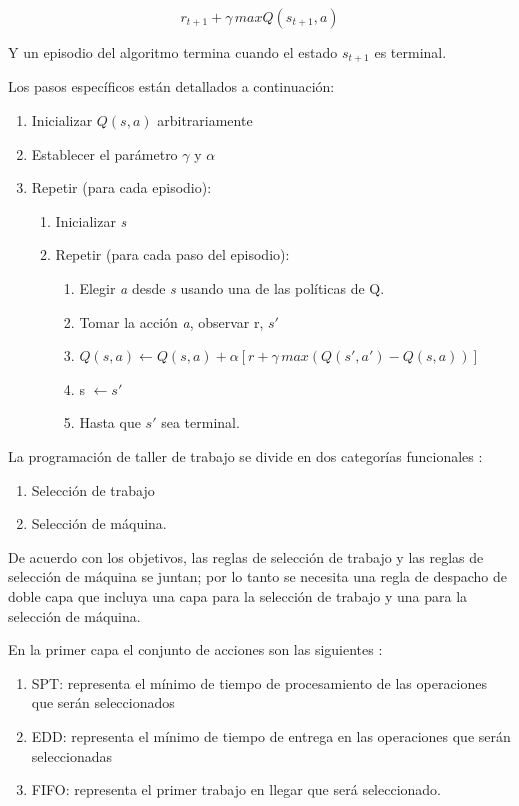 \documentclass[letterpaper, 10 pt]{article}
\begin{document}
\begin{equation}
	r_{t+1} + \gamma \, max Q(s_{t+1},a)
\end{equation} 

Y un episodio del algoritmo termina cuando el estado $s_{t+1}$ es terminal.

Los pasos específicos están detallados a continuación:

\begin{enumerate}
	\item Inicializar $Q(s,a)$ arbitrariamente
	\item Establecer el parámetro $\gamma$ y $\alpha$
	\item Repetir (para cada episodio):
	\begin{enumerate}[1]
		\item Inicializar \textit{s}
		\item Repetir (para cada paso del episodio):
		\begin{enumerate}[2.1]
			\item Elegir \textit{a} desde \textit{s} usando una de las políticas de Q.
			\item Tomar la acción \textit{a}, observar r, $s'$
			\item $	\displaystyle	Q(s,a) \leftarrow Q(s,a) + \alpha[r + \gamma \, max(Q(s',a') - Q(s,a) )] $
			\item s $\leftarrow s'$ 
			\item Hasta que $s'$ sea terminal.
		\end{enumerate}
	\end{enumerate}
\end{enumerate}

La programación de taller de trabajo se divide en dos categorías funcionales \citep{zhao2019improved}:
\begin{enumerate}
	\item Selección de trabajo
	\item Selección de máquina.
\end{enumerate}
De acuerdo con los objetivos, las reglas de selección de trabajo y las reglas de selección de máquina se juntan; por lo tanto se necesita una regla de despacho de doble capa que incluya una capa para la selección de trabajo y una para la selección de máquina.

En la primer capa el conjunto de acciones son las siguientes \citep{zhao2019improved}:

\begin{enumerate}
	\item SPT: representa el mínimo de tiempo de procesamiento de las operaciones que serán seleccionados
	\item EDD: representa el mínimo de tiempo de entrega en las operaciones que serán seleccionadas
	\item FIFO: representa el primer trabajo en llegar que será seleccionado.
\end{enumerate}
\end{document}
